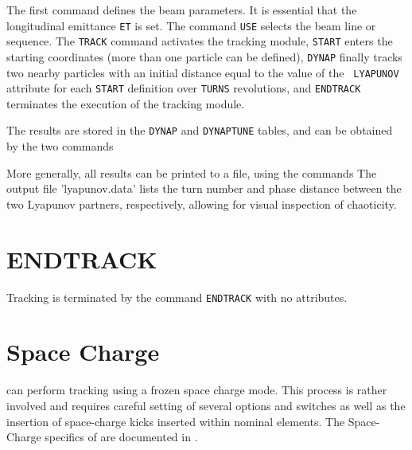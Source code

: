 
The first command defines the beam parameters. It is  essential that the
longitudinal emittance {\tt ET} is set. The command {\tt USE}
selects the beam line or sequence. The {\tt TRACK} command activates the
tracking module, {\tt START} enters the starting coordinates (more
than one particle can be defined),  {\tt DYNAP} finally tracks two
nearby particles  with an initial distance equal to the value of the {\tt 
LYAPUNOV} attribute  for each
{\tt START} definition over {\tt TURNS} revolutions, and
{\tt ENDTRACK} terminates the execution of the tracking module. 

The results are stored in the {\tt DYNAP} and {\tt DYNAPTUNE}
tables, and can be obtained by the two commands  
 

More generally, all results can be printed to a file, using the commands 
The output file 'lyapunov.data' lists the turn number and phase distance
between the two Lyapunov partners, respectively, allowing for visual
inspection of chaoticity.
 

\section{ENDTRACK}
\label{sec:endtrack}

Tracking is terminated by the command {\tt ENDTRACK} with no
attributes. 


\section{Space Charge}

\madx can perform tracking using a frozen space charge mode.
This process is rather involved and requires careful setting of several options 
and switches as well as the insertion of space-charge kicks inserted within 
nominal elements. The Space-Charge specifics of \madx are documented in 
\cite{kapin2013}.


